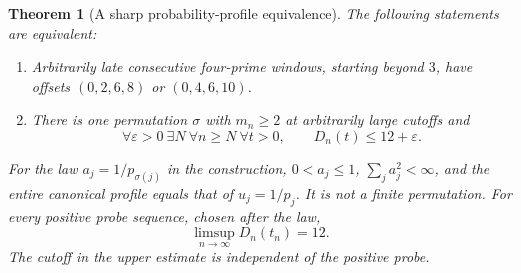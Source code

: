 \documentclass[11pt]{article}
\newtheorem{theorem}{Theorem}[section]
\theoremstyle{definition}
\begin{document}
\begin{theorem}[A sharp probability-profile equivalence]
The following statements are equivalent:
\begin{enumerate}
\item Arbitrarily late consecutive four-prime windows, starting beyond $3$,
have offsets $(0,2,6,8)$ or $(0,4,6,10)$.
\item There is one permutation $\sigma$ with $m_n\ge2$ at arbitrarily
large cutoffs and
\[
 \forall\varepsilon>0\ \exists N\
 \forall n\ge N\ \forall t>0,\qquad D_n(t)\le12+\varepsilon.
\]
\end{enumerate}
For the law $a_j=1/p_{\sigma(j)}$ in the construction, $0<a_j\le1$,
$\sum_j a_j^2<\infty$, and the entire canonical profile equals that of
$u_j=1/p_j$. It is \emph{not a finite permutation}. For every positive
probe sequence, chosen after the law,
\[
 \limsup_{n\to\infty}D_n(t_n)=12.
\]
The cutoff in the upper estimate is independent of the positive probe.
\end{theorem}
\end{document}
